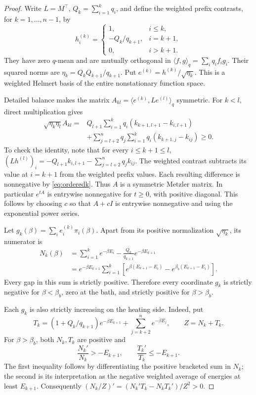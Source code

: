 \documentclass[11pt]{article}
\begin{document}
\begin{proof}
Write $L=M^\top$, $Q_k=\sum_{i=1}^kq_i$, and define the weighted prefix
contrasts, for $k=1,\ldots,n-1$, by
\[
h^{(k)}_i=\begin{cases}
1,&i\leq k,\\
-Q_k/q_{k+1},&i=k+1,\\
0,&i>k+1.
\end{cases}
\]
They have zero $q$-mean and are mutually orthogonal in
$\langle f,g\rangle_q=\sum_iq_if_ig_i$. Their squared norms are
$\eta_k=Q_kQ_{k+1}/q_{k+1}$. Put $e^{(k)}=h^{(k)}/\sqrt{\eta_k}$.
This is a weighted Helmert basis of the entire nonstationary function space.

Detailed balance makes the matrix $A_{kl}=\langle e^{(k)},Le^{(l)}\rangle_q$
symmetric. For $k<l$, direct multiplication gives
\begin{align}\label{eq:helmertoffdiag}
\sqrt{\eta_k\eta_l}A_{kl}
={}&Q_{l+1}\sum_{i=1}^kq_i(k_{k+1,l+1}-k_{i,l+1})\\
&+\sum_{j=l+2}^nq_j\sum_{i=1}^kq_i(k_{k+1,j}-k_{ij})\geq0.\nonumber
\end{align}
To check the identity, note that for every $i\leq k+1\leq l$,
$(Lh^{(l)})_i=-Q_{l+1}k_{i,l+1}-\sum_{j=l+2}^nq_jk_{ij}$.
The weighted contrast subtracts its value at $i=k+1$ from the weighted
prefix values. Each resulting difference is nonnegative by
\eqref{eq:orderedk}. Thus $A$ is a symmetric Metzler matrix. In particular
$e^{tA}$ is entrywise nonnegative for $t\geq0$, with positive diagonal.
This follows by choosing $c$ so that $A+cI$ is entrywise nonnegative and
using the exponential power series.

Let $g_k(\beta)=\sum_i e^{(k)}_i\pi_i(\beta)$. Apart from its positive
normalization $\sqrt{\eta_k}$, its numerator is
\begin{align*}
N_k(\beta)
&=\sum_{i=1}^k e^{-\beta E_i}-\frac{Q_k}{q_{k+1}}e^{-\beta E_{k+1}}\\
&=e^{-\beta E_{k+1}}\sum_{i=1}^k
\left[e^{\beta(E_{k+1}-E_i)}-e^{\beta_b(E_{k+1}-E_i)}\right].
\end{align*}
Every gap in this sum is strictly positive. Therefore every coordinate
$g_k$ is strictly negative for $\beta<\beta_b$, zero at the bath, and
strictly positive for $\beta>\beta_b$.

Each $g_k$ is also strictly increasing on the heating side. Indeed, put
\[
T_k=(1+Q_k/q_{k+1})e^{-\beta E_{k+1}}+
\sum_{j=k+2}^ne^{-\beta E_j},\qquad Z=N_k+T_k.
\]
For $\beta>\beta_b$, both $N_k,T_k$ are positive and
\[
\frac{N_k'}{N_k}>-E_{k+1},\qquad
\frac{T_k'}{T_k}\leq-E_{k+1}.
\]
The first inequality follows by differentiating the positive bracketed sum
in $N_k$; the second is its interpretation as the negative weighted average
of energies at least $E_{k+1}$. Consequently
$(N_k/Z)'=(N_k'T_k-N_kT_k')/Z^2>0$.


\end{proof}
\end{document}
